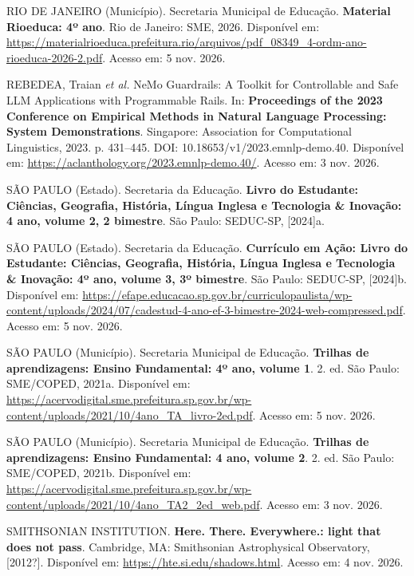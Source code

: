 RIO DE JANEIRO (Município). Secretaria Municipal de Educação. \textbf{Material Rioeduca: 4º ano}. Rio de Janeiro: SME, 2026. Disponível em: \url{https://materialrioeduca.prefeitura.rio/arquivos/pdf_08349_4-ordm-ano-rioeduca-2026-2.pdf}. Acesso em: 5 nov. 2026.

REBEDEA, Traian \textit{et al.} NeMo Guardrails: A Toolkit for Controllable and Safe LLM Applications with Programmable Rails. In: \textbf{Proceedings of the 2023 Conference on Empirical Methods in Natural Language Processing: System Demonstrations}. Singapore: Association for Computational Linguistics, 2023. p. 431--445. DOI: 10.18653/v1/2023.emnlp-demo.40. Disponível em: \url{https://aclanthology.org/2023.emnlp-demo.40/}. Acesso em: 3 nov. 2026.

SÃO PAULO (Estado). Secretaria da Educação. \textbf{Livro do Estudante: Ciências, Geografia, História, Língua Inglesa e Tecnologia \& Inovação: 4\textordmasculine{} ano, volume 2, 2\textordmasculine{} bimestre}. São Paulo: SEDUC-SP, [2024]a.

SÃO PAULO (Estado). Secretaria da Educação. \textbf{Currículo em Ação: Livro do Estudante: Ciências, Geografia, História, Língua Inglesa e Tecnologia \& Inovação: 4º ano, volume 3, 3º bimestre}. São Paulo: SEDUC-SP, [2024]b. Disponível em: \url{https://efape.educacao.sp.gov.br/curriculopaulista/wp-content/uploads/2024/07/cadestud-4-ano-ef-3-bimestre-2024-web-compressed.pdf}. Acesso em: 5 nov. 2026.

SÃO PAULO (Município). Secretaria Municipal de Educação. \textbf{Trilhas de aprendizagens: Ensino Fundamental: 4º ano, volume 1}. 2. ed. São Paulo: SME/COPED, 2021a. Disponível em: \url{https://acervodigital.sme.prefeitura.sp.gov.br/wp-content/uploads/2021/10/4ano_TA_livro-2ed.pdf}. Acesso em: 5 nov. 2026.

SÃO PAULO (Município). Secretaria Municipal de Educação. \textbf{Trilhas de aprendizagens: Ensino Fundamental: 4\textordmasculine{} ano, volume 2}. 2. ed. São Paulo: SME/COPED, 2021b. Disponível em: \url{https://acervodigital.sme.prefeitura.sp.gov.br/wp-content/uploads/2021/10/4ano_TA2_2ed_web.pdf}. Acesso em: 3 nov. 2026.

SMITHSONIAN INSTITUTION. \textbf{Here. There. Everywhere.: light that does not pass}. Cambridge, MA: Smithsonian Astrophysical Observatory, [2012?]. Disponível em: \url{https://hte.si.edu/shadows.html}. Acesso em: 4 nov. 2026.

